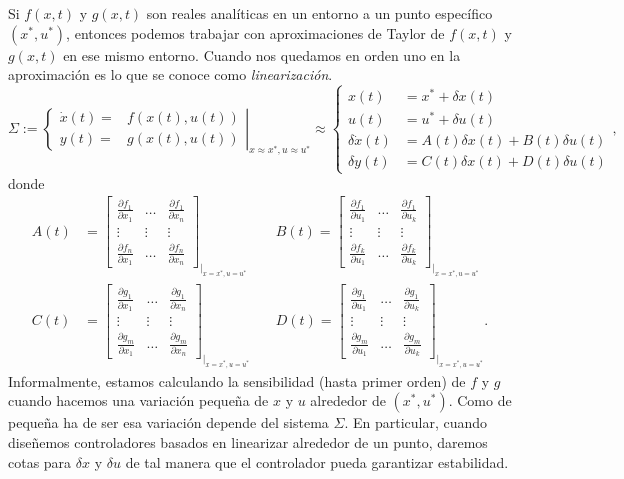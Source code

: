 Si $f(x,t)$ y $g(x,t)$ son reales analíticas en un entorno a un punto específico $(x^*,u^*)$, entonces podemos trabajar con aproximaciones de Taylor de $f(x,t)$ y $g(x,t)$ en ese mismo entorno. Cuando nos quedamos en orden uno en la aproximación es lo que se conoce como \emph{linearización}.
\begin{equation}
	\Sigma := \left.\begin{cases}
	\dot x(t) =& f(x(t),u(t)) \\ y(t) =& g(x(t),u(t))
	\end{cases}\right|_{x\approx x^*, u\approx u^*} \approx
	\begin{cases}
		x(t) &= x^* + \delta x(t) \\
		u(t) &= u^* + \delta u(t) \\
	\delta \dot x(t) &= A(t)\delta x(t) + B(t)\delta u(t) \\
	\delta y(t) &= C(t)\delta x(t) + D(t)\delta u(t)
	\end{cases}, \nonumber
\end{equation}
donde
\begin{align}
	A(t) &= \begin{bmatrix}
		\frac{\partial f_1}{\partial x_1} & \dots & \frac{\partial f_1}{\partial x_n} \\
		\vdots & \vdots & \vdots \\
		\frac{\partial f_n}{\partial x_1} & \dots & \frac{\partial f_n}{\partial x_n}
	\end{bmatrix}_{|_{x=x^*, u=u^*}} \quad
	&B(t) = \begin{bmatrix}
		\frac{\partial f_1}{\partial u_1} & \dots & \frac{\partial f_1}{\partial u_k} \\
		\vdots & \vdots & \vdots \\
		\frac{\partial f_k}{\partial u_1} & \dots & \frac{\partial f_k}{\partial u_k}
	\end{bmatrix}_{|_{x=x^*, u=u^*}} \nonumber \\
	C(t) &= \begin{bmatrix}
		\frac{\partial g_1}{\partial x_1} & \dots & \frac{\partial g_1}{\partial x_n} \\
		\vdots & \vdots & \vdots \\
		\frac{\partial g_m}{\partial x_1} & \dots & \frac{\partial g_m}{\partial x_n}
	\end{bmatrix}_{|_{x=x^*, u=u^*}} \quad
	&D(t) = \begin{bmatrix}
		\frac{\partial g_1}{\partial u_1} & \dots & \frac{\partial g_1}{\partial u_k} \\
		\vdots & \vdots & \vdots \\
		\frac{\partial g_m}{\partial u_1} & \dots & \frac{\partial g_m}{\partial u_k}
	\end{bmatrix}_{|_{x=x^*, u=u^*}}. \nonumber
\end{align}
Informalmente, estamos calculando la sensibilidad (hasta primer orden) de $f$ y $g$ cuando hacemos una variación pequeña de $x$ y $u$ alrededor de $(x^*,u^*)$. Como de pequeña ha de ser esa variación depende del sistema $\Sigma$. En particular, cuando diseñemos controladores basados en linearizar alrededor de un punto, daremos cotas para $\delta x$ y $\delta u$ de tal manera que el controlador pueda garantizar estabilidad.

